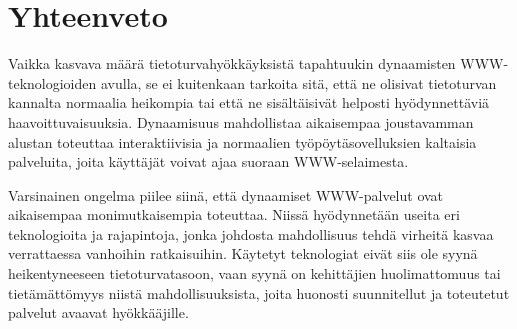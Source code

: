 %

\section{Yhteenveto}

Vaikka kasvava määrä tietoturvahyökkäyksistä tapahtuukin dynaamisten
WWW-teknologioiden avulla, se ei kuitenkaan tarkoita sitä, että ne
olisivat tietoturvan kannalta normaalia heikompia tai että ne
sisältäisivät helposti hyödynnettäviä haavoittuvaisuuksia. Dynaamisuus
mahdollistaa aikaisempaa joustavamman alustan toteuttaa
interaktiivisia ja normaalien työpöytäsovelluksien kaltaisia
palveluita, joita käyttäjät voivat ajaa suoraan
WWW-selaimesta.

Varsinainen ongelma piilee siinä, että dynaamiset WWW-palvelut ovat
aikaisempaa monimutkaisempia toteuttaa. Niissä hyödynnetään useita eri
teknologioita ja rajapintoja, jonka johdosta mahdollisuus tehdä
virheitä kasvaa verrattaessa vanhoihin ratkaisuihin. Käytetyt
teknologiat eivät siis ole syynä heikentyneeseen tietoturvatasoon,
vaan syynä on kehittäjien huolimattomuus tai tietämättömyys niistä
mahdollisuuksista, joita huonosti suunnitellut ja toteutetut palvelut
avaavat hyökkääjille.
